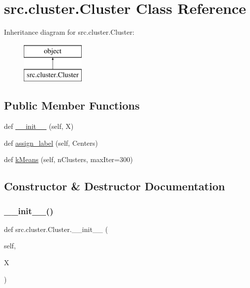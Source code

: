 \hypertarget{classsrc_1_1cluster_1_1Cluster}{}\section{src.\+cluster.\+Cluster Class Reference}
\label{classsrc_1_1cluster_1_1Cluster}
Inheritance diagram for src.\+cluster.\+Cluster\+:\begin{figure}[H]
\begin{center}
\leavevmode
\includegraphics[height=2.000000cm]{classsrc_1_1cluster_1_1Cluster}
\end{center}
\end{figure}
\subsection*{Public Member Functions}
\begin{DoxyCompactItemize}
\item 
def \hyperlink{classsrc_1_1cluster_1_1Cluster_aecb660a329d008897008ccb17a49f349}{\+\_\+\+\_\+init\+\_\+\+\_\+} (self, X)
\item 
def \hyperlink{classsrc_1_1cluster_1_1Cluster_a8cb50b6db992f7a5c686c0d00fb2343a}{assign\+\_\+label} (self, Centers)
\item 
def \hyperlink{classsrc_1_1cluster_1_1Cluster_afd29b7a67da864dbc7b8352e8ed0cdab}{k\+Means} (self, n\+Clusters, max\+Iter=300)
\end{DoxyCompactItemize}


\subsection{Constructor \& Destructor Documentation}
\mbox{\label{classsrc_1_1cluster_1_1Cluster_aecb660a329d008897008ccb17a49f349}} 
\subsubsection{\texorpdfstring{\+\_\+\+\_\+init\+\_\+\+\_\+()}{\_\_init\_\_()}}
{\footnotesize\ttfamily def src.\+cluster.\+Cluster.\+\_\+\+\_\+init\+\_\+\+\_\+ (\begin{DoxyParamCaption}\item[{}]{self,  }\item[{}]{X }\end{DoxyParamCaption})}

